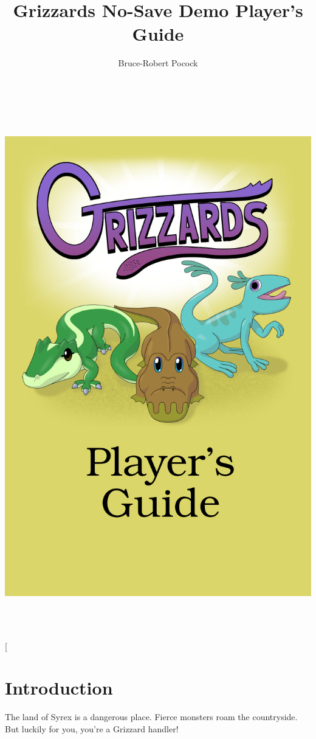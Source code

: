 \documentclass[10pt,twocolumn,openany,article]{memoir}
\title{Grizzards \ifdefined\NOSAVE No-Save \fi\ifdefined\DEMO Demo \fi Player's Guide}
\author{Bruce-Robert Pocock}
\begin{document}
\frontmatter
\thispagestyle{empty}

\includegraphics[height=9in,width=6in,interpolate,bb=-6in 0 9in 6in]{../Manual/Cover.png}

\thispagestyle{empty}

\twocolumn[

\chapter*{Introduction}\label{Introduction}

The  land of  Syrex  is  a dangerous  place.  Fierce  monsters roam  the
countryside. But luckily for you, you're a Grizzard handler!
\end{document}
